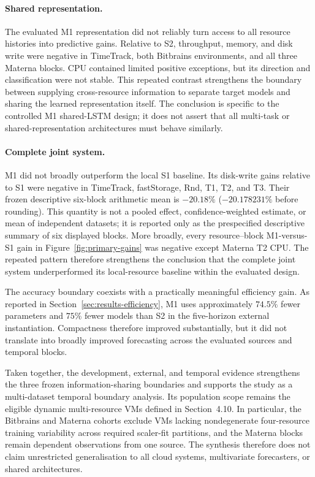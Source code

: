 \documentclass[a4paper,fleqn]{cas-dc}
\begin{document}
\paragraph{Shared representation.}
The evaluated M1 representation did not reliably turn access to all resource
histories into predictive gains. Relative to S2, throughput, memory, and disk
write were negative in TimeTrack, both Bitbrains environments, and all three
Materna blocks. CPU contained limited positive exceptions, but its direction
and classification were not stable. This repeated contrast strengthens the
boundary between supplying cross-resource information to separate target
models and sharing the learned representation itself. The conclusion is
specific to the controlled M1 shared-LSTM design; it does not assert that all
multi-task or shared-representation architectures must behave similarly.

\paragraph{Complete joint system.}
M1 did not broadly outperform the local S1 baseline. Its disk-write gains
relative to S1 were negative in TimeTrack, fastStorage, Rnd, T1, T2, and T3.
Their frozen descriptive six-block arithmetic mean is $-20.18\%$
($-20.178231\%$ before rounding). This quantity is not a pooled effect,
confidence-weighted estimate, or mean of independent datasets; it is reported
only as the prespecified descriptive summary of six displayed blocks. More
broadly, every resource--block M1-versus-S1 gain in
Figure~\ref{fig:primary-gains} was negative except Materna T2 CPU. The repeated
pattern therefore strengthens the conclusion that the complete joint system
underperformed its local-resource baseline within the evaluated design.

The accuracy boundary coexists with a practically meaningful efficiency gain.
As reported in Section~\ref{sec:results-efficiency}, M1 uses approximately
$74.5\%$ fewer parameters and $75\%$ fewer models than S2 in the five-horizon
external instantiation. Compactness therefore improved substantially, but it
did not translate into broadly improved forecasting across the evaluated
sources and temporal blocks.

Taken together, the development, external, and temporal evidence strengthens
the three frozen information-sharing boundaries and supports the study as a
multi-dataset temporal boundary analysis. Its population scope remains the
eligible dynamic multi-resource VMs defined in Section~4.10. In particular,
the Bitbrains and Materna cohorts exclude VMs lacking nondegenerate
four-resource training variability across required scaler-fit partitions, and
the Materna blocks remain dependent observations from one source. The synthesis
therefore does not claim unrestricted generalisation to all cloud systems,
multivariate forecasters, or shared architectures.
\end{document}
